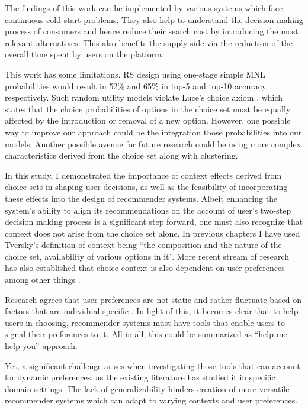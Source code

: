 \documentclass[a4paper,12pt]{article}
\newcommand{\citeyearonly}[1]{\citeyearpar{#1}}
\begin{document}
The findings of this work can be implemented by various systems which face continuous cold-start problems. They also help to understand the decision-making process of consumers and hence reduce their search cost by introducing the most relevant alternatives. This also benefits the supply-side via the reduction of the overall time spent by users on the platform.

This work has some limitations. RS design using one-stage simple MNL probabilities would result in 52\% and 65\% in top-5 and top-10 accuracy, respectively. Such random utility models violate Luce's choice axiom \citep{luce2012individual}, which states that the choice probabilities of options in the choice set must be equally affected by the introduction or removal of a new option. However, one possible way to improve our approach could be the integration those probabilities into our models. Another possible avenue for future research could be using more complex characteristics derived from the choice set along with clustering.


In this study, I demonstrated the importance of context effects derived from choice sets in shaping user decisions, as well as the feasibility of incorporating these effects into the design of recommender systems.
Albeit enhancing the system's ability to align its recommendations on the account of user's two-step decision making process is a significant step forward, one must also recognize that context does not arise from the choice set alone. In previous chapters I have used Tversky's \citeyearonly{tversky1972elimination} definition of context being ``the composition  and the nature of the choice set, availability of various options in it''. More recent stream of research has also established that choice context is also dependent on user preferences among other things \citep{dey2001understanding, adomavicius2011context}.

Research agrees that user preferences are not static and rather fluctuate based on factors that are individual specific \citep{songWhenHowDiversify2019}. In light of this, it becomes clear that to help users in choosing, recommender systems must have tools that enable users to signal their preferences to it. All in all, this could be summarized as ``help me help you'' approach.

Yet, a significant challenge arises when investigating those tools that can account for dynamic preferences, as the existing literature has studied it in specific domain settings. The lack of generalizability hinders creation of more versatile recommender systems which can adapt to varying contexts and user preferences. 
\end{document}

